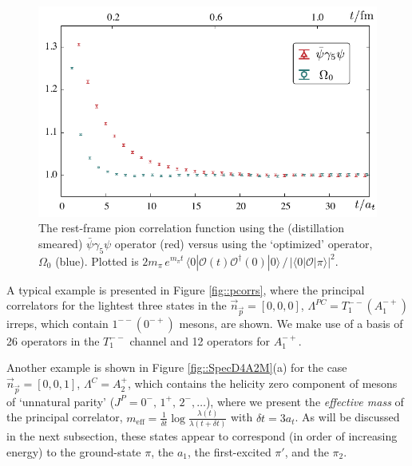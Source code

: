 \documentclass[twocolumn,amsmath,amssymb,prd,10pt,floatfix, 
superscriptaddress,nofootinbib, showpacs, preprintnumbers]{revtex4-1}
\begin{document}
\begin{figure}
\includegraphics[width=0.9 \linewidth]{fig3.pdf}
\caption{The rest-frame pion correlation function using the (distillation smeared) $\bar{\psi}\gamma_5 \psi$ operator (red) versus using the `optimized' operator, $\Omega_0$ (blue). Plotted is $2m_\pi\,  e^{m_\pi t} \, \langle 0| \mathcal{O}(t) \mathcal{O}^\dagger(0) | 0 \rangle  \,/ \, \lvert \langle 0 | \mathcal{O} | \pi \rangle\rvert^2 $.
\label{fig::TwoPointRelaxation}}
\end{figure}


A typical example is presented in Figure \ref{fig::pcorrs}, where the principal correlators for the lightest three states in the $\vec{n}_{\vec{p}}=[0,0,0]$, $\Lambda^{PC} = T_1^{--} (A_1^{-+})$ irreps, which contain $1^{--}(0^{-+})$ mesons, are shown. We make use of a basis of 26 operators in the $T_1^{--}$ channel and 12 operators for $A_1^{-+}$. 


Another example is shown in Figure \ref{fig::SpecD4A2M}(a) for the case $\vec{n}_{\vec{p}}=[0,0,1]$, $\Lambda^C = A_2^+$, which contains the helicity zero component of mesons of `unnatural parity' (${J^P=0^-,\, 1^+,\, 2^-,\ldots}$), where we present the \emph{effective mass} of the principal correlator, $m_\mathrm{eff} = \tfrac{1}{\delta t} \log \tfrac{\lambda(t)}{\lambda(t+\delta t)}$ with $\delta t = 3 a_t$. As will be discussed in the next subsection, these states appear to correspond (in order of increasing energy) to the ground-state $\pi$, the $a_1$, the first-excited $\pi'$, and the $\pi_2$.
\end{document}
